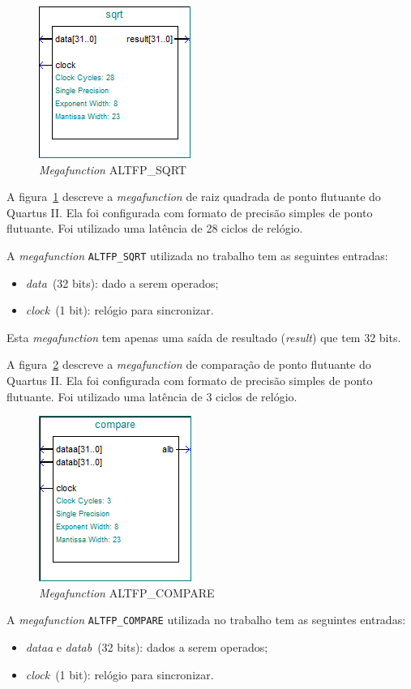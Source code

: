 \documentclass[12pt]{article}
\begin{document}
\begin{figure}[h]
\centering
\includegraphics[width=.3\textwidth]{../apresentacao/sqrt}
\caption{\textit{Megafunction} ALTFP\_SQRT}
\label{fig:sqrt}
\end{figure}

A figura~\ref{fig:sqrt} descreve a \textit{megafunction} de raiz quadrada de
ponto flutuante do Quartus II. Ela foi configurada com formato de precisão
simples de ponto flutuante. Foi utilizado uma latência de 28 ciclos de relógio.

A \textit{megafunction} \verb|ALTFP_SQRT| utilizada no trabalho tem as
seguintes entradas:
\begin{itemize}
\item \textit{data}~(32 bits): dado a serem operados;
\item \textit{clock}~(1 bit): relógio para sincronizar.
\end{itemize}

Esta \textit{megafunction} tem apenas uma saída de resultado (\textit{result})
que tem 32 bits.


A figura~\ref{fig:compare} descreve a \textit{megafunction} de comparação de
ponto flutuante do Quartus II. Ela foi configurada com formato de precisão
simples de ponto flutuante. Foi utilizado uma latência de 3 ciclos de relógio.

\begin{figure}[h]
\centering
\includegraphics[width=.3\textwidth]{../apresentacao/compare}
\caption{\textit{Megafunction} ALTFP\_COMPARE}
\label{fig:compare}
\end{figure}

A \textit{megafunction} \verb|ALTFP_COMPARE| utilizada no trabalho tem as
seguintes entradas:
\begin{itemize}
\item \textit{dataa} e \textit{datab}~(32 bits): dados a serem operados;
\item \textit{clock}~(1 bit): relógio para sincronizar.
\end{itemize}
\end{document}
